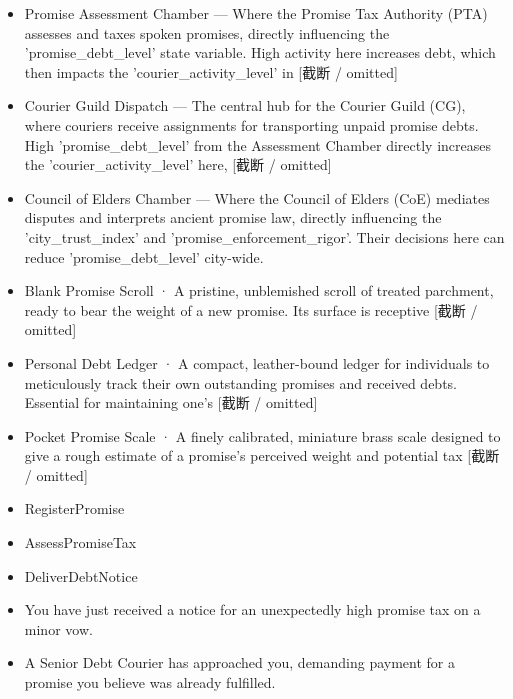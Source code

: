 \documentclass[10pt,a4paper]{article}
\newcommand{\heading}[1]{\par\vspace{5pt}{\color{teal}\bfseries #1}\par}
\begin{document}
\begin{minipage}[t]{0.48\linewidth}\fontsize{9}{12}\selectfont\raggedright\setlength{\parskip}{0pt}
\heading{地点与用途}\begin{itemize}
\item Promise Assessment Chamber — Where the Promise Tax Authority (PTA) assesses and taxes spoken promises, directly influencing the 'promise\_debt\_level' state variable. High activity here increases debt, which then impacts the 'courier\_activity\_level' in [截断 / omitted]
\item Courier Guild Dispatch — The central hub for the Courier Guild (CG), where couriers receive assignments for transporting unpaid promise debts. High 'promise\_debt\_level' from the Assessment Chamber directly increases the 'courier\_activity\_level' here, [截断 / omitted]
\item Council of Elders Chamber — Where the Council of Elders (CoE) mediates disputes and interprets ancient promise law, directly influencing the 'city\_trust\_index' and 'promise\_enforcement\_rigor'. Their decisions here can reduce 'promise\_debt\_level' city-wide.
\end{itemize}
\heading{物件}\begin{itemize}
\item Blank Promise Scroll · A pristine, unblemished scroll of treated parchment, ready to bear the weight of a new promise. Its surface is receptive [截断 / omitted]
\item Personal Debt Ledger · A compact, leather-bound ledger for individuals to meticulously track their own outstanding promises and received debts. Essential for maintaining one's [截断 / omitted]
\item Pocket Promise Scale · A finely calibrated, miniature brass scale designed to give a rough estimate of a promise's perceived weight and potential tax [截断 / omitted]
\end{itemize}
\heading{可能采取的行动}\begin{itemize}
\item RegisterPromise
\item AssessPromiseTax
\item DeliverDebtNotice
\end{itemize}
\heading{玩家进入方式}\begin{itemize}
\item You have just received a notice for an unexpectedly high promise tax on a minor vow.
\item A Senior Debt Courier has approached you, demanding payment for a promise you believe was already fulfilled.
\end{itemize}
\end{minipage}
\end{document}
